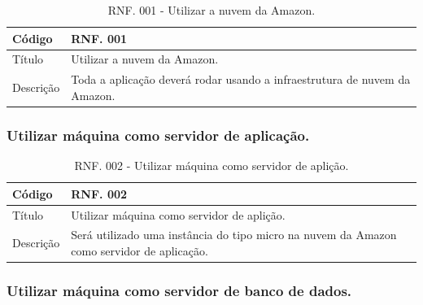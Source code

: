 \documentclass[11pt]{article}
\begin{document}
        \begin{table}[h]
          \begin{center}
            \begin{tabular}{ | p{5cm} | p{10cm} | }
              \hline
              Código\cellcolor{gray} & RNF. 001\cellcolor{gray} \\
              \hline
              Título & Utilizar a nuvem da Amazon. \\
              \hline
              Descrição & Toda a aplicação deverá rodar usando a infraestrutura de nuvem da Amazon. \\
              \hline
            \end{tabular}
            \caption{RNF. 001 - Utilizar a nuvem da Amazon.}
          \end{center}
        \end{table}

      \subsubsection{Utilizar máquina como servidor de aplicação.}

        \begin{table}[h]
          \begin{center}
            \begin{tabular}{ | p{5cm} | p{10cm} | }
              \hline
              Código\cellcolor{gray} & RNF. 002\cellcolor{gray} \\
              \hline
              Título & Utilizar máquina como servidor de aplição. \\
              \hline
              Descrição & Será utilizado uma instância do tipo micro na nuvem da Amazon como servidor de aplicação. \\
              \hline
            \end{tabular}
            \caption{RNF. 002 - Utilizar máquina como servidor de aplição.}
          \end{center}
        \end{table}

    \clearpage

      \subsubsection{Utilizar máquina como servidor de banco de dados.}
\end{document}
